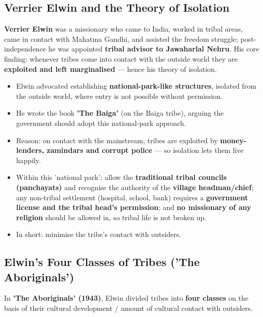 \subsection{Verrier Elwin and the Theory of Isolation}

\textbf{Verrier Elwin} was a missionary who came to India, worked in tribal areas, came in contact with Mahatma Gandhi, and assisted the freedom struggle; post-independence he was appointed \textbf{tribal advisor to Jawaharlal Nehru}. His core finding: whenever tribes come into contact with the outside world they are \textbf{exploited and left marginalised} --- hence his theory of isolation.

\begin{KeyConcept}
\begin{itemize}
\item Elwin advocated establishing \textbf{national-park-like structures}, isolated from the outside world, where entry is not possible without permission.
\item He wrote the book \textbf{'The Baiga'} (on the Baiga tribe), arguing the government should adopt this national-park approach.
\item Reason: on contact with the mainstream, tribes are exploited by \textbf{money-lenders, zamindars and corrupt police} --- so isolation lets them live happily.
\item Within this 'national park': allow the \textbf{traditional tribal councils (panchayats)} and recognise the authority of the \textbf{village headman/chief}; any non-tribal settlement (hospital, school, bank) requires a \textbf{government license and the tribal head's permission}; and \textbf{no missionary of any religion} should be allowed in, so tribal life is not broken up.
\item In short: minimise the tribe's contact with outsiders.
\end{itemize}
\end{KeyConcept}

\subsection{Elwin's Four Classes of Tribes ('The Aboriginals')}

In \textbf{'The Aboriginals' (1943)}, Elwin divided tribes into \textbf{four classes} on the basis of their cultural development / amount of cultural contact with outsiders.

